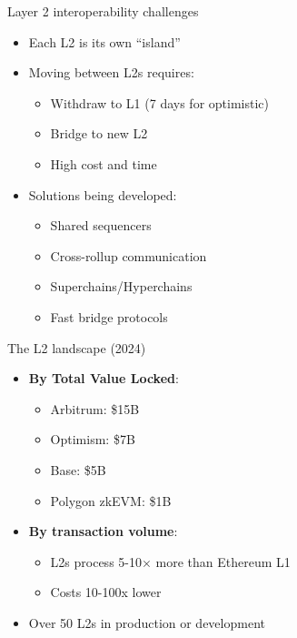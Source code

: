 \documentclass[aspectratio=169, lualatex, handout]{beamer}
\begin{document}
\begin{frame}{Layer 2 interoperability challenges}
	\begin{itemize}
		\item Each L2 is its own ``island''
		\item Moving between L2s requires:
		      \begin{itemize}
			      \item Withdraw to L1 (7 days for optimistic)
			      \item Bridge to new L2
			      \item High cost and time
		      \end{itemize}
		\item Solutions being developed:
		      \begin{itemize}
			      \item Shared sequencers
			      \item Cross-rollup communication
			      \item Superchains/Hyperchains
			      \item Fast bridge protocols
		      \end{itemize}
	\end{itemize}
\end{frame}

\begin{frame}{The L2 landscape (2024)}
	\begin{itemize}
		\item \textbf{By Total Value Locked}:
		      \begin{itemize}
			      \item Arbitrum: \approx\$15B
			      \item Optimism: \approx\$7B
			      \item Base: \approx\$5B
			      \item Polygon zkEVM: \approx\$1B
		      \end{itemize}
		\item \textbf{By transaction volume}:
		      \begin{itemize}
			      \item L2s process 5-10$\times$ more than Ethereum L1
			      \item Costs 10-100x lower
		      \end{itemize}
		\item Over 50 L2s in production or development
	\end{itemize}
\end{frame}
\end{document}

